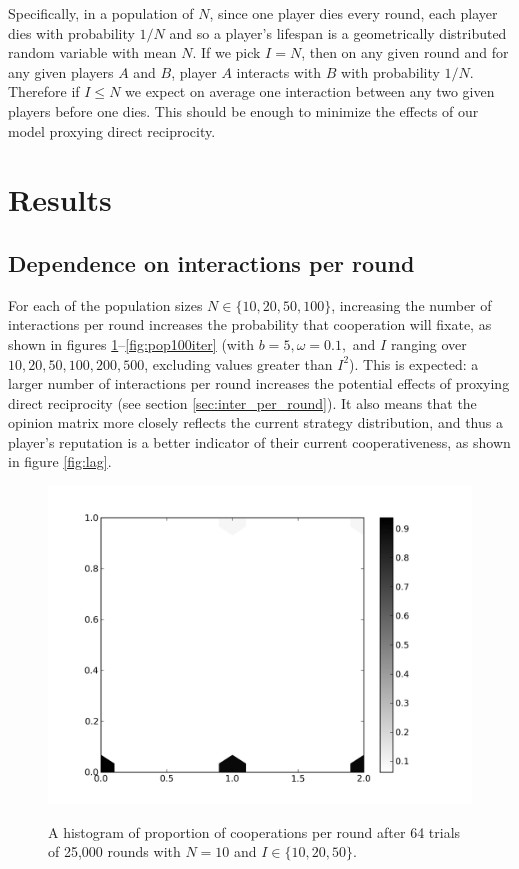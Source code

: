 \documentclass{amsart}
\newcommand{\om}{\omega}
\begin{document}
Specifically, in a population of $N$, since one player dies every
round, each player dies with probability $1/N$ and so a player's
lifespan is a geometrically distributed random variable with mean
$N$. If we pick $I=N$, then on any given round and for any given
players $A$ and $B$, player $A$ interacts with $B$ with probability
$1/N$. Therefore if $I\le N$ we expect on average one interaction
between any two given players before one dies. This should be enough
to minimize the effects of our model proxying direct reciprocity.

\section{Results}
\label{sec:results}

\subsection{Dependence on interactions per round}

For each of the population sizes $N \in \{10,20,50,100\}$, increasing
the number of interactions per round increases the probability that
cooperation will fixate, as shown in figures
\ref{fig:pop10iter}--\ref{fig:pop100iter} (with $b=5, \om=0.1,$ and
$I$ ranging over $10,20,50,100,200,500$, excluding values greater than
$I^2$). This is expected: a larger number of interactions per round
increases the potential effects of proxying direct reciprocity (see
section \ref{sec:inter_per_round}). It also means that the opinion
matrix more closely reflects the current strategy distribution, and
thus a player's reputation is a better indicator of their current
cooperativeness, as shown in figure \ref{fig:lag}.

\begin{figure}[h]
\caption{A histogram of proportion of cooperations per round after 64
  trials of 25,000 rounds with $N=10$ and $I \in \{10,20,50\}$.}

\includegraphics[width=\textwidth]{pop10iter.png}
\label{fig:pop10iter}
\end{figure}
\end{document}
